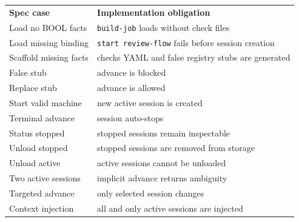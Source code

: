 \documentclass[a4paper,10pt,fleqn]{article}
\begin{document}
\begin{center}
\begin{tabular}{ll}
\textbf{Spec case} & \textbf{Implementation obligation} \\
Load no BOOL facts & \texttt{build-job} loads without check files \\
Load missing binding & \texttt{start review-flow} fails before session creation \\
Scaffold missing facts & checks YAML and false registry stubs are generated \\
False stub & advance is blocked \\
Replace stub & advance is allowed \\
Start valid machine & new active session is created \\
Terminal advance & session auto-stops \\
Status stopped & stopped sessions remain inspectable \\
Unload stopped & stopped sessions are removed from storage \\
Unload active & active sessions cannot be unloaded \\
Two active sessions & implicit advance returns ambiguity \\
Targeted advance & only selected session changes \\
Context injection & all and only active sessions are injected \\
\end{tabular}
\end{center}
\end{document}
